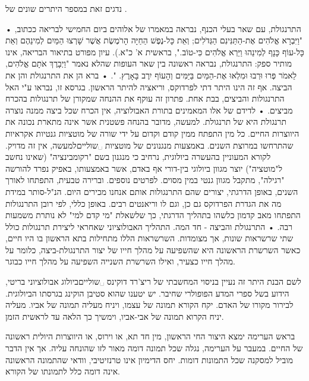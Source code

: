 נדגים זאת במספר היתרים שונים של .
\begin{enumerate}
•  התרנגולת, עם שאר בעלי הכנף, נבראה במאמרו של אלוהים ביום החמישי לבריאה ככתוב, "וַיִּבְרָא אֱלֹהִים אֶת-הַתַּנִּינִם הַגְּדֹלִים; וְאֵת כָּל-נֶפֶשׁ הַחַיָּה הָרֹמֶשֶׂת אֲשֶׁר שָׁרְצוּ הַמַּיִם לְמִינֵהֶם וְאֵת כָּל-עוֹף כָּנָף לְמִינֵהוּ וַיַּרְא אֱלֹהִים כִּי-טוֹב.", בראשית א' כ"א.). עיון מפורט בתיאור הבריאה, אינו מותיר ספק: התרנגולת, נבראה ראשונה בין שאר העופות שהלא נאמר "וַיְבָרֶךְ אֹתָם אֱלֹהִים, לֵאמֹר פְּרוּ וּרְבוּ וּמִלְאוּ אֶת-הַמַּיִם בַּיַּמִּים וְהָעוֹף יִרֶב בָּאָרֶץ. ".
•   ברא הן את התרנגולת והן את הביצה. אף זה הינו היתר דתי לפרדוקס, וריאציה להיתר הראשון. בגרסא זו, נבראו ע"י האל התרנגולות והביצים, בבת אחת. פתרון זה עוקף את ההנחה שמקורן של תרנגולות בהכרח מביצים.
•  לדידם של אלו המאמינים בתורת האבולוציה, אין הכרח שכל ביצה ממנה נוצרה תרנגולת היא של תרנגולת. למעשה, מדובר בהנחה פשטנית אשר אינה מתארת נכונה את היווצרות החיים. כל מין התפתח ממין קודם וקדום על ידי שורה של מוטציות גנטיות אקראיות שהתרחשו במרוצת השנים. באמצעות מנגנונים של מוטציות ␣שוליים{למעשה, אין זה מדויק. לקורא המעוניין בהעשרה ביולוגית, נרחיב כי מנגנון בשם "רקומבינציה" (שאינו נחשב ל"מוטציה") יוצר מגוון ביולוגי בין-דורי אף באדם, אשר באמצעותו, באפיק נפרד להורשה "רגילה", מתקבל מגוון גנטי במין מסוים. לפרטים נוספים.} וברירה טבעית, התפתחו לאורך השנים, באופן הדרגתי, יצורים שהם התרנגולות אותם אנחנו מכירים היום. הנ"ל-סותר במידת מה את הגדרת הפרדוקס גם כן, וגם לו וריאנטים רבים. באופן כללי, לפי רובן התרנגולות התפתחו מאב קדמון כלשהו בתהליך הדרגתי, כך שלשאלת "מי קדם למי" לא נותרת משמעות רבה.
•  התרנגולת והביצה - חד המה. התהליך האבולוציוני שאחראי ליצירת תרנגולות כולל שתי שרשראות שונות, אך מצומדות. השרשראות הללו מתחילות בתא הראשון בו היו חיים, כאשר השרשרת הראשונה היא שהשפיעה על מהלך חייו של יצור התרנגולת-ביצה, כלומר על מהלך חייו כצעיר, ואילו השרשרת השנייה השפיעה על מהלך חייו כבוגר.

לשם הבנת היתר זה נעיין בניסוי המחשבתי של ריצ'רד דוקינס ␣שוליים{ביולוג אבולוציוני בריטי, הידוע בשל ספרי המדע הפופולרי שחיבר. יש יטענו שהוא סטיבן הוקינג בגרסתו הביולוגית.} לבירור מקורו של האדם. יקח הקורא תמונה של עצמו, ויניח מעליה תמונה של אביו. מעליה יניח הקרוא תמונה של אבי-אביו, וימשיך כך הלאה עד לראשית הזמן.

בראש הערימה ימצא היצור החי הראשון, מין חד תא, או וירוס, או היווצרות היולית ראשונה של החיים. במעבר על הערימה, נגלה שכל תמונה דומה מאור לזו שהונחה עליה. אך אין הדבר מוביל למסקנה שכל התמונות דומות. יחס הדימיון אינו טרנזיטיבי, וודאי שהתמונה הראשונה אינה דומה כלל לתמונתו של הקורא.


\end{enumerate}
